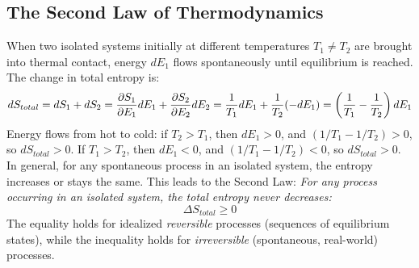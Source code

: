 \documentclass[10pt, letterpaper]{article}
\begin{document}
\subsection{The Second Law of Thermodynamics}
When two isolated systems initially at different temperatures $T_1 \neq T_2$ are brought into thermal contact, energy $dE_1$ flows spontaneously until equilibrium is reached. The change in total entropy is:
\begin{equation*}
    dS_{total} = dS_1 + dS_2 = \pdv{S_1}{E_1} dE_1 + \pdv{S_2}{E_2} dE_2 = \frac{1}{T_1} dE_1 + \frac{1}{T_2} (-dE_1) = \left( \frac{1}{T_1} - \frac{1}{T_2} \right) dE_1
\end{equation*}
Energy flows from hot to cold: if $T_2 > T_1$, then $dE_1 > 0$, and $(1/T_1 - 1/T_2) > 0$, so $dS_{total} > 0$. If $T_1 > T_2$, then $dE_1 < 0$, and $(1/T_1 - 1/T_2) < 0$, so $dS_{total} > 0$. In general, for any spontaneous process in an isolated system, the entropy increases or stays the same. This leads to the Second Law:
\textit{For any process occurring in an isolated system, the total entropy never decreases:}
\begin{equation}
    \Delta S_{total} \ge 0
\end{equation}
The equality holds for idealized \textit{reversible} processes (sequences of equilibrium states), while the inequality holds for \textit{irreversible} (spontaneous, real-world) processes.
\end{document}
